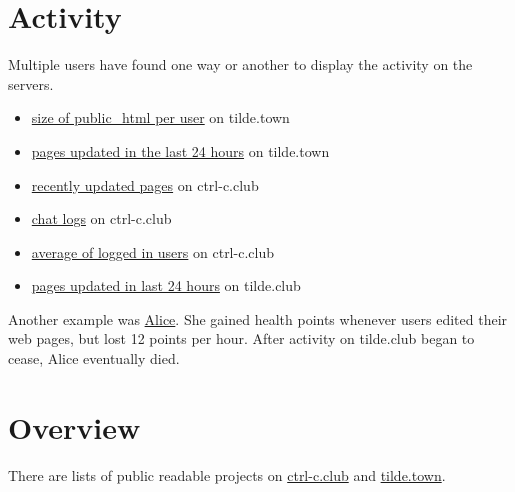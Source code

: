 \section{Activity}
Multiple users have found one way or another to display the activity on the servers.
\begin{itemize}
	\item \href{http://tilde.town/~sharp/size.html}{size of public\_html per user} on tilde.town
	\item \href{http://tilde.town/~ags/updated.html}{pages updated in the last 24 hours} on tilde.town
	\item \href{http://www.ctrl-c.club/~pgadey/updated.html}{recently updated pages} on ctrl-c.club
	\item \href{http://ctrl-c.club/~greymtr/logs/}{chat logs} on ctrl-c.club
	\item \href{http://ctrl-c.club/~gauntlet/o/online.html}{average of logged in users} on ctrl-c.club
	\item \href{http://tilde.club/~delfuego/tilde.24h.html}{pages updated in last 24 hours} on tilde.club
\end{itemize}

Another example was \href{http://tilde.club/~globz/alice.txt}{Alice}. She gained health points whenever users edited their web pages, but lost 12 points per hour. After activity on tilde.club began to cease, Alice eventually died.

\section{Overview}
There are lists of public readable projects on \href{http://ctrl-c.club/~bear/code.html}{ctrl-c.club} and \href{http://tilde.town/~audy/code.html}{tilde.town}.
